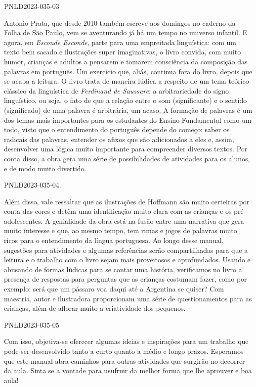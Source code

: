 \documentclass[11pt]{extarticle}
\begin{document}
PNLD2023-035-03

Antonio Prata, que desde 2010 também escreve aos domingos no caderno da Folha de São Paulo, vem se aventurando já há um tempo no universo infantil. E agora, em \textit{Esconde Esconde}, parte para uma empreitada linguística: com um texto bem sacado e ilustrações super imaginativas, o livro convida, com muito humor, crianças e adultos a pensarem e tomarem consciência da composição das palavras em português. Um exercício que, aliás, continua fora do livro, depois que se acaba a leitura. O livro trata de maneira lúdica a respeito de um tema teórico clássico da linguística de \textit{Ferdinand de Saussure}: a arbitrariedade do signo linguístico, ou seja, o fato de que a relação entre o som (significante) e o sentido (significado) de uma palavra é arbitrária, um acaso. A formação de palavras é um dos temas mais importantes para os estudantes do Ensino Fundamental como um todo, visto que o entendimento do português depende do começo: saber os radicais das palavras, entender os afixos que são adicionados a eles e, assim, desenvolver uma lógica muito importante para compreender diversos textos. Por conta disso, a obra gera uma série de possibilidades de atividades para os alunos, e de modo muito divertido. 

PNLD2023-035-04.

Além disso, vale ressaltar que as ilustrações de Hoffmann são muito certeiras por conta das cores e detêm uma identificação muito clara com as crianças e os pré-adolescentes. A genialidade da obra está na fusão entre uma narrativa que gera muito interesse e que, ao mesmo tempo, tem rimas e jogos de palavras muito ricos para o entendimento da língua portuguesa. Ao longo desse manual, sugestões para atividades e algumas referências serão compartilhadas para que a leitura e o trabalho com o livro sejam mais proveitosos e aprofundados. Usando e abusando de formas lúdicas para se contar uma história, verificamos no livro a presença de respostas para perguntas que as crianças costumam fazer, como por exemplo: será que um pássaro voa daqui até a Argentina se quiser? Com maestria, autor e ilustradora proporcionam uma série de questionamentos para as crianças, além de aflorar muito a criatividade dos pequenos. 

PNLD2023-035-05

Com isso, objetiva-se oferecer algumas ideias e inspirações para um trabalho que pode ser desenvolvido tanto a curto quanto a médio e longo prazos. Esperamos que este manual abra caminhos para outras atividades que surgirão no decorrer da aula. Sinta se a vontade para usufruir da melhor forma que lhe aprouver e boa aula!
\end{document}

